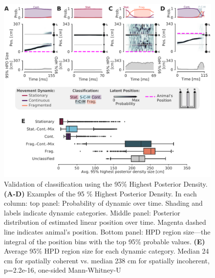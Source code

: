 \documentclass[9pt,lineno]{elife}
\providecommand{\DIFaddbeginFL}{} %
\providecommand{\DIFaddendFL}{} %
\providecommand{\DIFdelbeginFL}{} %
\providecommand{\DIFdelendFL}{} %
\newcommand{\DIFscaledelfig}{0.5}
\newlength{\DIFdelgraphicswidth} %
\newlength{\DIFdelgraphicsheight} %
\newcommand{\DIFaddincludegraphics}[2][]{{\color{blue}\fbox{\DIFOincludegraphics[#1]{#2}}}} %
\newcommand{\DIFdelincludegraphics}[2][]{%
\sbox{\DIFdelgraphicsbox}{\DIFOincludegraphics[#1]{#2}}%
\settoboxwidth{\DIFdelgraphicswidth}{\DIFdelgraphicsbox} %
\settoboxtotalheight{\DIFdelgraphicsheight}{\DIFdelgraphicsbox} %
\scalebox{\DIFscaledelfig}{%
\parbox[b]{\DIFdelgraphicswidth}{\usebox{\DIFdelgraphicsbox}\\[-\baselineskip] \rule{\DIFdelgraphicswidth}{0em}}\llap{\resizebox{\DIFdelgraphicswidth}{\DIFdelgraphicsheight}{%
\setlength{\unitlength}{\DIFdelgraphicswidth}%
\begin{picture}(1,1)%
\thicklines\linethickness{2pt} %
{\color[rgb]{1,0,0}\put(0,0){\framebox(1,1){}}}%
{\color[rgb]{1,0,0}\put(0,0){\line( 1,1){1}}}%
{\color[rgb]{1,0,0}\put(0,1){\line(1,-1){1}}}%
\end{picture}%
}\hspace*{3pt}}} %
} %
\DeclareRobustCommand{\DIFaddbeginFL}{\DIFOaddbeginFL \let\includegraphics\DIFaddincludegraphics} %
\DeclareRobustCommand{\DIFaddendFL}{\DIFOaddendFL \let\includegraphics\DIFOincludegraphics} %
\DeclareRobustCommand{\DIFdelbeginFL}{\DIFOdelbeginFL \let\includegraphics\DIFdelincludegraphics} %
\DeclareRobustCommand{\DIFdelendFL}{\DIFOaddendFL \let\includegraphics\DIFOincludegraphics} %
\begin{document}
\begin{figure}
\DIFdelbeginFL %
\DIFdelendFL \DIFaddbeginFL \includegraphics[width=0.80\linewidth]{figures/Figure4/Figure4_v7}
\DIFaddendFL \caption{Validation of classification using the 95\% Highest Posterior Density. \textbf{(A-D)}  Examples of the 95 \% Highest Posterior Density. In each column: top panel: Probability of dynamic over time. Shading and labels indicate dynamic categories. Middle panel: Posterior distribution of estimated linear position over time. Magenta dashed line indicates animal's position. Bottom panel: HPD region size---the integral of the position bins with the top 95\% probable values. \textbf{(E)} Average 95\% HPD region size for each dynamic category. Median 24 cm for spatially coherent vs. median 238 cm for spatially incoherent, p=2.2e-16, one-sided Mann-Whitney-U}
\label{fig:4}


\end{figure}
\end{document}
